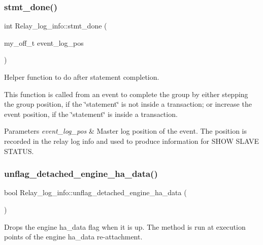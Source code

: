 \subsubsection{\texorpdfstring{stmt\+\_\+done()}{stmt\_done()}}
{\footnotesize\ttfamily int Relay\+\_\+log\+\_\+info\+::stmt\+\_\+done (\begin{DoxyParamCaption}\item[{my\+\_\+off\+\_\+t}]{event\+\_\+log\+\_\+pos }\end{DoxyParamCaption})}

Helper function to do after statement completion.

This function is called from an event to complete the group by either stepping the group position, if the \char`\"{}statement\char`\"{} is not inside a transaction; or increase the event position, if the \char`\"{}statement\char`\"{} is inside a transaction.


\begin{DoxyParams}{Parameters}
{\em event\+\_\+log\+\_\+pos} & Master log position of the event. The position is recorded in the relay log info and used to produce information for {\ttfamily S\+H\+OW S\+L\+A\+VE S\+T\+A\+T\+US}. \\
\hline
\end{DoxyParams}
\mbox{\label{classRelay__log__info_aff59190d1b65e2e5c8aacac048351b3a}} 
\subsubsection{\texorpdfstring{unflag\+\_\+detached\+\_\+engine\+\_\+ha\+\_\+data()}{unflag\_detached\_engine\_ha\_data()}}
{\footnotesize\ttfamily bool Relay\+\_\+log\+\_\+info\+::unflag\+\_\+detached\+\_\+engine\+\_\+ha\+\_\+data (\begin{DoxyParamCaption}{ }\end{DoxyParamCaption})\hspace{0.3cm}{\ttfamily [inline]}}

Drops the engine ha\+\_\+data flag when it is up. The method is run at execution points of the engine ha\+\_\+data re-\/attachment.

